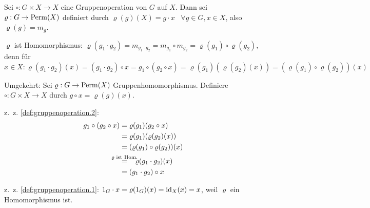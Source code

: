 \begin{beweis}
    \item Sei $\circ: G \times X \rightarrow X$ eine Gruppenoperation von $G$
          auf $X$. Dann sei $\varrho: G \rightarrow \operatorname{Perm}(X)$ definiert
          durch $\varrho(g)(X) = g \cdot x \;\;\; \forall g \in G, x \in X$,
          also $\varrho(g) = m_g$.

          $\varrho$ ist Homomorphismus: $\varrho(g_1 \cdot g_2) = m_{g_1 \cdot g_2} = m_{g_1} \circ m_{g_2} = \varrho(g_1) \circ \varrho(g_2)$,
          denn für $x \in X: \varrho(g_1 \cdot g_2) (x) = (g_1 \cdot g_2) \circ x = g_1 \circ (g_2 \circ x) = \varrho(g_1) (\varrho(g_2)(x)) = (\varrho(g_1) \circ \varrho (g_2)) (x)$

          Umgekehrt: Sei $\varrho: G \rightarrow \operatorname{Perm}(X)$ Gruppenhomomorphismus. Definiere $\circ: G \times X \rightarrow X$ durch $g \circ x = \varrho (g)(x)$.

          z.~z. \cref{def:gruppenoperation.2}: 
          \begin{align*}
            g_1 \circ (g_2 \circ x) &= \varrho (g_1) (g_2 \circ x)\\
            &= \varrho(g_1) (\varrho(g_2)(x))\\
            &= (\varrho(g_1) \circ \varrho(g_2))(x)\\
            &\overset{\mathclap{\varrho \text { ist Hom.}}}{=}\hspace{3 mm} \varrho(g_1 \cdot g_2) (x)\\
            &= (g_1 \cdot g_2) \circ x
          \end{align*}

            z.~z. \cref{def:gruppenoperation.1}: 
            $1_G \cdot x = \varrho(1_G)(x) = \textnormal{id}_X(x) = x$, weil $\varrho$ ein 
            Homomorphismus ist.
\end{beweis}

